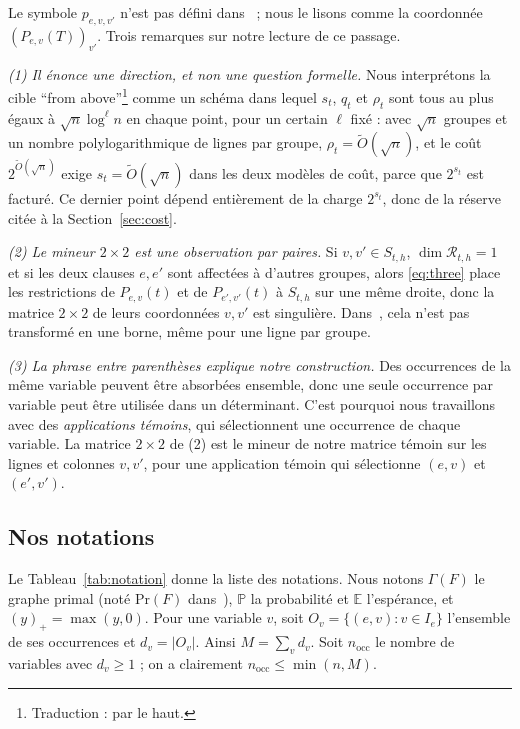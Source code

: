 \documentclass[11pt,a4paper]{article}
\makeatletter
\theoremstyle{definition}
\theoremstyle{remark}
\newcommand{\E}{\mathbb{E}}
\newcommand{\PP}{\mathbb{P}}
\newcommand{\cR}{\mathcal{R}}
\newcommand{\Gr}{\Gamma}
\newcommand{\nocc}{n_{\mathrm{occ}}}
\newcommand{\englishhyph}{\@ifundefined{l@english}{}{\language\l@english}}
\newcommand{\eng}[1]{{\englishhyph #1}}
\makeatother
\begin{document}
Le symbole $p_{e,v,v'}$ n'est pas défini dans~\cite{DL} ; nous le lisons comme la coordonnée
$(P_{e,v}(T))_{v'}$. Trois remarques sur notre lecture de ce passage.

\emph{(1) Il énonce une direction, et non une question formelle.} Nous interprétons la cible
\eng{``from above''}\footnote{Traduction : \og par le haut\fg{}.} comme un schéma dans
lequel $s_t$, $q_t$ et $\rho_t$ sont tous au plus égaux à $\sqrt n\log^{\ell}n$ en chaque
point, pour un certain $\ell$ fixé : avec $\sqrt n$ groupes et un nombre polylogarithmique
de lignes par groupe, $\rho_t=\tilde O(\sqrt n)$, et le coût $2^{\tilde O(\sqrt n)}$ exige
$s_t=\tilde O(\sqrt n)$ dans les deux modèles de coût, parce que $2^{s_t}$ est facturé. Ce
dernier point dépend entièrement de la charge $2^{s_t}$, donc de la réserve citée à la
Section~\ref{sec:cost}.

\emph{(2) Le mineur $2\times2$ est une observation par paires.} Si $v,v'\in S_{t,h}$,
$\dim\cR_{t,h}=1$ et si les deux clauses $e,e'$ sont affectées à d'autres groupes, alors
\eqref{eq:three} place les restrictions de $P_{e,v}(t)$ et de $P_{e',v'}(t)$ à $S_{t,h}$ sur
une même droite, donc la matrice $2\times2$ de leurs coordonnées $v,v'$ est singulière.
Dans~\cite{DL}, cela n'est pas transformé en une borne, même pour une ligne par groupe.

\emph{(3) La phrase entre parenthèses explique notre construction.} Des occurrences de la
même variable peuvent être absorbées ensemble, donc une seule occurrence par variable peut
être utilisée dans un déterminant. C'est pourquoi nous travaillons avec des
\emph{applications témoins}, qui sélectionnent une occurrence de chaque variable. La matrice
$2\times2$ de (2) est le mineur de notre matrice témoin sur les lignes et colonnes $v,v'$,
pour une application témoin qui sélectionne $(e,v)$ et $(e',v')$.

\subsection{Nos notations}\label{sec:ournot}

Le Tableau~\ref{tab:notation} donne la liste des notations. Nous notons $\Gr(F)$ le graphe
primal (noté $\mathrm{Pr}(F)$ dans~\cite{DL}), $\PP$ la probabilité et $\E$ l'espérance, et
$(y)_+=\max(y,0)$. Pour une variable $v$, soit $O_v=\{(e,v):v\in I_e\}$ l'ensemble de ses
occurrences et $d_v=|O_v|$. Ainsi $M=\sum_vd_v$. Soit $\nocc$ le nombre de variables avec
$d_v\ge1$ ; on a clairement $\nocc\le\min(n,M)$.
\end{document}
